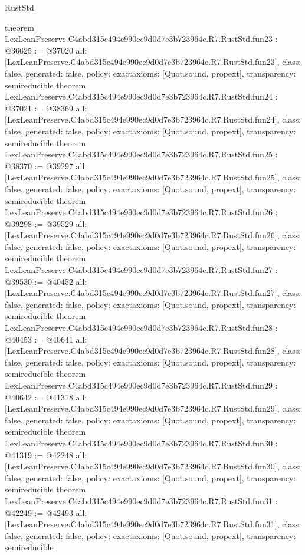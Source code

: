 \begin{lexlean}{RustStd}
\begin{coremodule}
{}
theorem LexLeanPreserve.C4abd315c494e990ec9d0d7e3b723964c.R7.RustStd.fun23 : @36625 := @37020 {
  all: [LexLeanPreserve.C4abd315c494e990ec9d0d7e3b723964c.R7.RustStd.fun23],
  class: false,
  generated: false,
  policy: exact{axioms: [Quot.sound, propext]},
  transparency: semireducible
}
theorem LexLeanPreserve.C4abd315c494e990ec9d0d7e3b723964c.R7.RustStd.fun24 : @37021 := @38369 {
  all: [LexLeanPreserve.C4abd315c494e990ec9d0d7e3b723964c.R7.RustStd.fun24],
  class: false,
  generated: false,
  policy: exact{axioms: [Quot.sound, propext]},
  transparency: semireducible
}
theorem LexLeanPreserve.C4abd315c494e990ec9d0d7e3b723964c.R7.RustStd.fun25 : @38370 := @39297 {
  all: [LexLeanPreserve.C4abd315c494e990ec9d0d7e3b723964c.R7.RustStd.fun25],
  class: false,
  generated: false,
  policy: exact{axioms: [Quot.sound, propext]},
  transparency: semireducible
}
theorem LexLeanPreserve.C4abd315c494e990ec9d0d7e3b723964c.R7.RustStd.fun26 : @39298 := @39529 {
  all: [LexLeanPreserve.C4abd315c494e990ec9d0d7e3b723964c.R7.RustStd.fun26],
  class: false,
  generated: false,
  policy: exact{axioms: [Quot.sound, propext]},
  transparency: semireducible
}
theorem LexLeanPreserve.C4abd315c494e990ec9d0d7e3b723964c.R7.RustStd.fun27 : @39530 := @40452 {
  all: [LexLeanPreserve.C4abd315c494e990ec9d0d7e3b723964c.R7.RustStd.fun27],
  class: false,
  generated: false,
  policy: exact{axioms: [Quot.sound, propext]},
  transparency: semireducible
}
theorem LexLeanPreserve.C4abd315c494e990ec9d0d7e3b723964c.R7.RustStd.fun28 : @40453 := @40641 {
  all: [LexLeanPreserve.C4abd315c494e990ec9d0d7e3b723964c.R7.RustStd.fun28],
  class: false,
  generated: false,
  policy: exact{axioms: [Quot.sound, propext]},
  transparency: semireducible
}
theorem LexLeanPreserve.C4abd315c494e990ec9d0d7e3b723964c.R7.RustStd.fun29 : @40642 := @41318 {
  all: [LexLeanPreserve.C4abd315c494e990ec9d0d7e3b723964c.R7.RustStd.fun29],
  class: false,
  generated: false,
  policy: exact{axioms: [Quot.sound, propext]},
  transparency: semireducible
}
theorem LexLeanPreserve.C4abd315c494e990ec9d0d7e3b723964c.R7.RustStd.fun30 : @41319 := @42248 {
  all: [LexLeanPreserve.C4abd315c494e990ec9d0d7e3b723964c.R7.RustStd.fun30],
  class: false,
  generated: false,
  policy: exact{axioms: [Quot.sound, propext]},
  transparency: semireducible
}
theorem LexLeanPreserve.C4abd315c494e990ec9d0d7e3b723964c.R7.RustStd.fun31 : @42249 := @42493 {
  all: [LexLeanPreserve.C4abd315c494e990ec9d0d7e3b723964c.R7.RustStd.fun31],
  class: false,
  generated: false,
  policy: exact{axioms: [Quot.sound, propext]},
  transparency: semireducible
}
\end{coremodule}
\end{lexlean}
